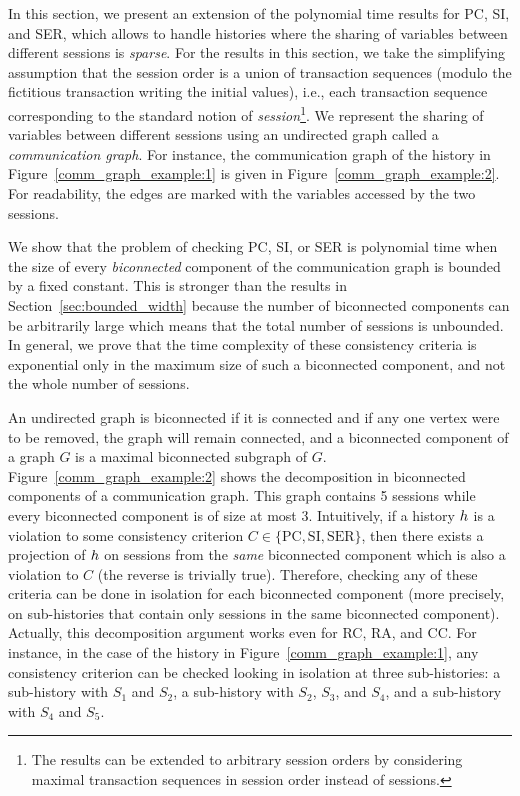 
In this section, we present an extension of the polynomial time results for PC, SI, and SER, which allows to handle histories where the sharing of variables between different sessions is \emph{sparse}. For the results in this section, we take the simplifying assumption that the session order is a union of transaction sequences (modulo the fictitious transaction writing the initial values), i.e., each transaction sequence corresponding to the standard notion of \emph{session}\footnote{The results can be extended to arbitrary session orders by considering maximal transaction sequences in session order instead of sessions.}.
We represent the sharing of variables between different sessions using an undirected graph called a \emph{communication graph}. For instance, the communication graph of the history in Figure~\ref{comm_graph_example:1} is given in Figure~\ref{comm_graph_example:2}. For readability, the edges are marked with the variables accessed by the two sessions.

We show that the problem of checking PC, SI, or SER is polynomial time when the size of every \emph{biconnected} component of the communication graph is bounded by a fixed constant. This is stronger than the results in Section~\ref{sec:bounded_width} because the number of biconnected components can be arbitrarily large which means that the total number of sessions is  unbounded. In general, we prove that the time complexity of these consistency criteria is exponential only in the maximum size of such a biconnected component, and not the whole number of sessions.

An undirected graph is biconnected if it is connected and if any one vertex were to be removed, the graph will remain connected, and a biconnected component of a graph $G$ is a maximal biconnected subgraph of $G$. Figure~\ref{comm_graph_example:2} shows the decomposition in biconnected components of a communication graph. This graph contains 5 sessions while every biconnected component is of size at most 3. Intuitively, if a history ${h}$ is a violation to some consistency criterion $C\in \{\text{PC}, \text{SI}, \text{SER}\}$, then there exists a projection of ${h}$ on sessions from the \emph{same} biconnected component which is also a violation to $C$ (the reverse is trivially true).
Therefore, checking any of these criteria can be done in isolation for each biconnected component (more precisely, on sub-histories that contain only sessions in the same biconnected component). Actually, this decomposition argument works even for RC, RA, and CC. For instance, in the case of the history in Figure~\ref{comm_graph_example:1}, any consistency criterion can be checked looking in isolation at three sub-histories: a sub-history with $S_1$ and $S_2$, a sub-history with $S_2$, $S_3$, and $S_4$, and a sub-history with $S_4$ and $S_5$.

